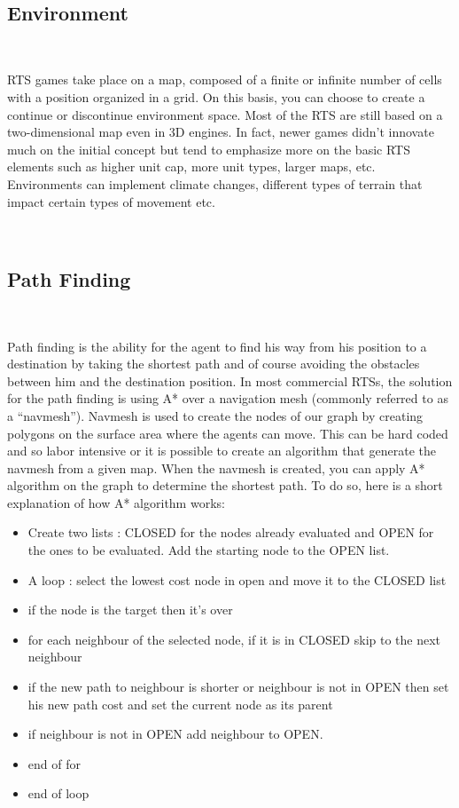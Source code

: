 \documentclass[a4paper,10pt]{book}
\newcommand{\quotes}[1]{``#1''}
\newcommand\tab[1][1cm]{\hspace*{#1}}
\begin{document}
~

\subsection{Environment}

~

RTS games take place on a map, composed of a finite or infinite number of cells with a position organized in a grid. On this basis,
you can choose to create a continue or discontinue environment space. Most of the RTS are still based on a two-dimensional map even 
in 3D engines. In fact, newer games didn't innovate much on the initial concept but tend to emphasize more on the basic RTS elements
such as higher unit cap, more unit types, larger maps, etc.
Environments can implement climate changes, different types of terrain that impact certain types of movement etc.

~


\subsection{Path Finding}

~

Path finding is the ability for the agent to find his way from his position to a destination by taking the shortest path and of course avoiding the obstacles between him and the destination position.
In most commercial RTSs, the solution for the path finding is using A* over a navigation mesh (commonly referred to as a \quotes{navmesh}). Navmesh is used to create the nodes of our graph by creating polygons	on the surface area where the agents can move. This can be hard coded and so labor intensive or it is possible to create an algorithm that generate the navmesh from a given map.
When the navmesh is created, you can apply A* algorithm on the graph to determine the shortest path.
To do so, here is a short explanation of how A* algorithm works:
\begin{itemize}
 \item Create two lists : CLOSED for the nodes already evaluated and OPEN for the ones to be evaluated. Add the starting node to the OPEN list.
 \item A loop : select the lowest cost node in open and move it to the CLOSED list
 \item \tab if the node is the target then it's over
 \item \tab for each neighbour of the selected node, if it is in CLOSED skip to the next neighbour
 \item \tab \tab if the new path to neighbour is shorter or neighbour is not in OPEN then set his new path cost and set the current node as its parent
 \item \tab \tab if neighbour is not in OPEN add neighbour to OPEN.
 \item	\tab end of for
 \item end of loop
\end{itemize}
             
\end{document}

